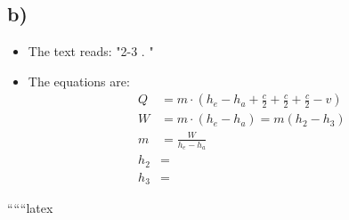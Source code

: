 

\subsection*{b)}

\begin{itemize}
    \item The text reads: "2-3 . "
    \item The equations are:
    \begin{align*}
        Q &= m \cdot (h_e - h_a + \frac{c}{2} + \frac{c}{2} + \frac{c}{2} - v) \\
        W &= m \cdot (h_e - h_a) = m (h_2 - h_3) \\
        m &= \frac{W}{h_e - h_a} \\
        h_2 &= \\
        h_3 &=
    \end{align*}
\end{itemize}

``````latex